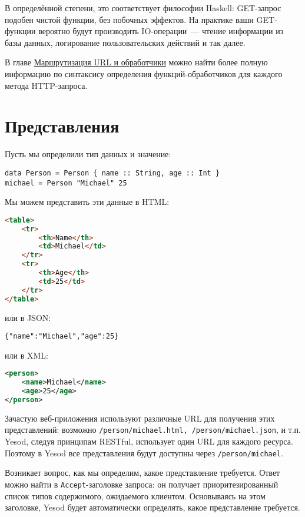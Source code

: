 В определённой степени, это соответствует философии Haskell: GET-запрос подобен чистой
функции, без побочных эффектов. На практике ваши GET-функции вероятно будут производить
IO-операции~--- чтение информации из базы данных, логирование пользовательских действий и
так далее.

В главе \hyperref[chap:routing]{Маршрутизация URL и обработчики} можно найти более
полную информацию по
синтаксису определения функций-обработчиков для каждого метода HTTP-запроса.

\section{Представления}

Пусть мы определили тип данных и значение:

\begin{lstlisting}
data Person = Person { name :: String, age :: Int }
michael = Person "Michael" 25
\end{lstlisting}

Мы можем представить эти данные в HTML:
\begin{lstlisting}[language=HTML]
 <table>
    <tr>
        <th>Name</th>
        <td>Michael</td>
    </tr>
    <tr>
        <th>Age</th>
        <td>25</td>
    </tr>
</table>
\end{lstlisting}

или в JSON:

\begin{lstlisting}
{"name":"Michael","age":25}
\end{lstlisting}

или в XML:
\begin{lstlisting}[language=XML]
<person>
    <name>Michael</name>
    <age>25</age>
</person>
\end{lstlisting}

Зачастую веб-приложения используют различные URL для получения этих представлений: возможно \lstinline'/person/michael.html, /person/michael.json', и т.п. Yesod, следуя принципам RESTful, использует один URL для каждого ресурса. Поэтому в Yesod все представления будут доступны через \lstinline'/person/michael'.

Возникает вопрос, как мы определим, какое представление требуется. Ответ можно найти в
\verb*|Accept|-заголовке запроса: он получает приоритезированный список типов содержимого,
ожидаемого клиентом. Основываясь на этом заголовке, Yesod будет автоматически определять,
какое представление требуется.

